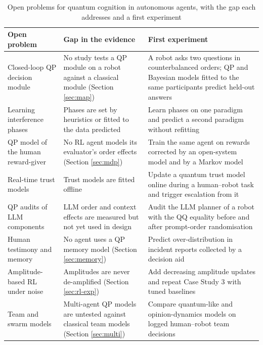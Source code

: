 \documentclass[pdflatex,sn-basic]{sn-jnl}
\begin{document}
\begin{table}[ht]
\centering
\caption{Open problems for quantum cognition in autonomous agents, with the gap each addresses and a first experiment}\label{tab:openproblems}
\footnotesize
\begin{tabular}{@{}>{\raggedright\arraybackslash}p{0.240\dimexpr\textwidth-6\tabcolsep\relax}>{\raggedright\arraybackslash}p{0.330\dimexpr\textwidth-6\tabcolsep\relax}>{\raggedright\arraybackslash}p{0.430\dimexpr\textwidth-6\tabcolsep\relax}@{}}
\toprule
\textbf{Open problem} & \textbf{Gap in the evidence} & \textbf{First experiment} \\
\midrule
Closed-loop QP decision module & No study tests a QP module on a robot against a classical module (Section \ref{sec:map}) & A robot asks two questions in counterbalanced orders; QP and Bayesian models fitted to the same participants predict held-out answers \\
Learning interference phases & Phases are set by heuristics or fitted to the data predicted~\citep{Moreira2016,Wichert2020} & Learn phases on one paradigm and predict a second paradigm without refitting \\
QP model of the human reward-giver & No RL agent models its evaluator's order effects (Section \ref{sec:mdp}) & Train the same agent on rewards corrected by an open-system model and by a Markov model \\
Real-time trust models & Trust models are fitted offline~\citep{Roeder2023,vanderMeer2025} & Update a quantum trust model online during a human--robot task and trigger escalation from it \\
QP audits of LLM components & LLM order and context effects are measured but not yet used in design~\citep{Lo2025,Kang2026} & Audit the LLM planner of a robot with the QQ equality before and after prompt-order randomisation \\
Human testimony and memory & No agent uses a QP memory model (Section \ref{sec:memory}) & Predict over-distribution in incident reports collected by a decision aid \\
Amplitude-based RL under noise & Amplitudes are never de-amplified (Section \ref{sec:rl-exp}) & Add decreasing amplitude updates and repeat Case Study 3 with tuned baselines \\
Team and swarm models & Multi-agent QP models are untested against classical team models (Section \ref{sec:multi}) & Compare quantum-like and opinion-dynamics models on logged human--robot team decisions \\
\bottomrule
\end{tabular}
\end{table}
\end{document}
